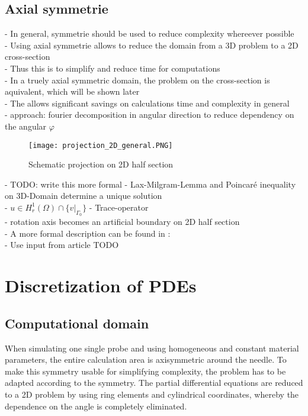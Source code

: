 \documentclass[parskip=half, titlepage=yes, 12pt, BCOR=12mm, DIV=calc]{scrartcl}
\begin{document}
\subsection{Axial symmetrie}
- In general, symmetrie should be used to reduce complexity whereever possible \\
- Using axial symmetrie allows to reduce the domain from a 3D problem to a 2D cross-section \\
- Thus this is to simplify and reduce time for computations \\
- In a truely axial symmetric domain, the problem on the cross-section is aquivalent, which will be shown later \\
- The allows significant savings on calculations time and complexity in general \\
- approach: fourier decomposition in angular direction to reduce dependency on the angular $\varphi$ \\

\begin{figure}[H]
    \centering
    \texttt{[image: projection\_2D\_general.PNG]}
    \caption{Schematic projection on 2D half section}
    \label{projection_2D_general}
\end{figure}


- TODO: write this more formal
- Lax-Milgram-Lemma and Poincaré inequality on 3D-Domain determine a unique solution \\
- $u \in H^{1}_{r}(\Omega) \cap \{ v|_{\Gamma_{0}} \}  $
- Trace-operator \\
- rotation axis becomes an artificial boundary on 2D half section \\

- A more formal description can be found in : \\
- Use input from article TODO \\


\section{Discretization of PDEs}

\subsection{Computational domain}

When simulating one single probe and using homogeneous and constant material parameters, the entire calculation area is axisymmetric around the needle. To make this symmetry usable for simplifying complexity, the problem has to be adapted according to the symmetry. The partial differential equations are reduced to a 2D problem by using ring elements and cylindrical coordinates, whereby the dependence on the angle is completely eliminated. \\
\end{document}
